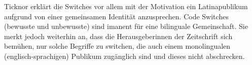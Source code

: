 Ticknor erklärt die Switches vor allem mit der Motivation ein Latinapublikum aufgrund von einer gemeinsamen Identität anzusprechen.
Code Switches (bewusste und unbewusste) sind imanent für eine bilinguale Gemeinschaft.
Sie merkt jedoch weiterhin an, dass die Herausgeberinnen der Zeitschrift sich bemühen, nur solche Begriffe zu switchen, die auch einem monolingualen (englisch-sprachigen) Publikum zugänglich sind und dieses nicht abschrecken.


\begin{comment}
[Ticknor12]
  code switching can arise from individual choice or be used as a major identity marker for a group for speakers who must deal with more than one language in their common pursuits. As Gal (1998, p. 247) explains, “code-switching is a conversational strategy used to establish, cross or destroy group boundaries; to create, evoke or change interpersonal relations with their rights and obligations.” The combination of grammatical constraints and social-psychological motivations for a magazine editor’s decision to put code-switch certain words is how a study involving written code-switching must proceed in order to fully account for the factors presented by sociolinguists up to this point.

es again and again Latina magazine is constructing a myth of what it means to be latina.  As Goffman explores in Gender Advertisements, the creation of a culture, be it gender-based or ethnicity-based, is built through the repetition of semiotic and textual messages.

how Latina identity is constructed through a combination of textual and image resources. In order to determine which aspects of identity are being appropriated for Latina identity as differentiated from feminine identity, studies of ‘womens’ magazines would also serve as a point of comparison.

[Mahootian05]
Die Autorin untersucht die Beziehung zwischen Code Choice (Sprachwahl?), zweisprachige Identität und Sprachwandel.
Sie stellt sich folgende Fragen:
* in wie fern sind stilistische und soziale Variablen, inklusive Identität verantwortlich für die Wahl des sprachlichen Codes?
"The first asks the extent to which stylistic and social variables, including
identity, govern code choice."
* was ist die Beziehung zwischen Wahl des sprachlichen Codes und Sprachwandel?
Dabei interpretiert sie die Benutzung von gemischtem Code in Druckmedien bereits als ein Zeichen von Sprachwandel.


\end{comment}
